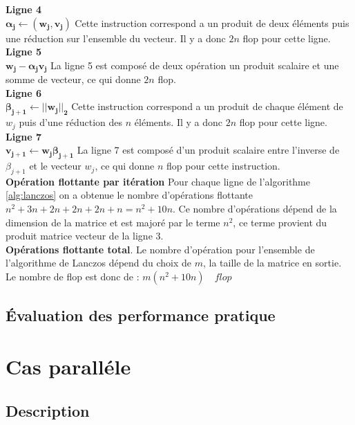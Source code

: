 \documentclass[11pt,french]{article}
\begin{document}
	\noindent \textbf{Ligne  4}\\
	$\boldsymbol {\alpha_j \gets (w_j,v_j)}$
	Cette instruction correspond a un produit de deux éléments puis une réduction sur l'ensemble du vecteur. Il y a donc $2n$ flop pour cette ligne. \\
	
	\noindent\textbf{Ligne  5}\\
	$\boldsymbol {w_j - \boldsymbol{\alpha_j} v_j}$
	La ligne 5 est composé de deux  opération un produit scalaire et une somme de vecteur, ce qui donne $2n$ flop. \\
	
	\noindent\textbf{Ligne  6}\\
	$\boldsymbol {\beta_{j+1} \gets || w_j||_2}$
	Cette instruction correspond a un produit de chaque élément de $w_j$ puis d'une réduction des $n$ éléments. Il y a donc $2n$ flop pour cette ligne.  \\
	
	\noindent\textbf{Ligne  7}\\
	$\boldsymbol {v_{j+1} \gets w_j \beta_{j+1}}$
	La ligne 7 est composé d'un produit scalaire entre l’inverse de $\beta_{j+1}$ et le vecteur $w_j$, ce qui donne $n$ flop pour cette instruction. \\ 
	
	\noindent\textbf{Opération flottante par itération}
	Pour chaque ligne de l'algorithme \ref{alg:lanczos} on a obtenue le nombre d’opérations flottante  $n^2 + 3n + 2n +2n +2n +n = n^2 + 10n$. Ce nombre d’opérations dépend de la dimension de la matrice et est majoré par le terme $n^2$, ce terme provient du produit matrice vecteur de la ligne 3. \\
	
	\noindent \textbf{Opérations flottante total}. Le nombre d’opération pour l'ensemble de l'algorithme de Lanczos dépend du choix de $m$, la taille de la matrice en sortie.\\ 
	Le nombre de flop est donc de : $  m(n^2 + 10n) \quad flop $
	
	\subsection{Évaluation des performance pratique}
	
	\section{Cas paralléle}
	
	\subsection{Description}
	
\end{document}

